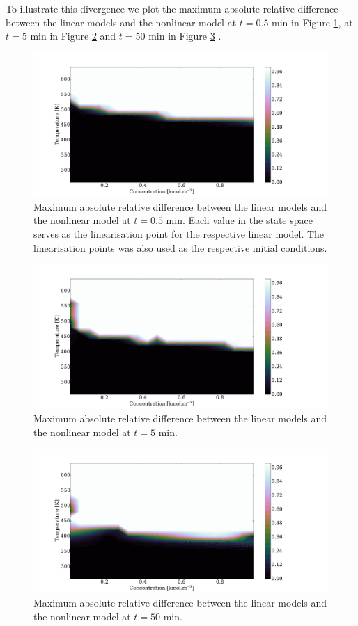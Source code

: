 \documentclass[../masters.tex]{subfiles}
\begin{document}
To illustrate this divergence we plot the maximum absolute relative difference between the linear models and the nonlinear model at $t = 0.5$ min in Figure \ref{fig_cstr_regions1}, at $t = 5$ min in Figure \ref{fig_cstr_regions2} and $t = 50$ min in Figure \ref{fig_cstr_regions3} . 
\begin{figure}[H] 
\centering
\includegraphics[scale=0.3]{cstr_regions1.pdf}
\caption{Maximum absolute relative difference between the linear models and the nonlinear model at $t=0.5$ min. Each value in the state space serves as the linearisation point for the respective linear model. The linearisation points was also used as the respective initial conditions.}
\label{fig_cstr_regions1}
\end{figure}
\begin{figure}[H] 
\centering
\includegraphics[scale=0.3]{cstr_regions3.pdf} %
\caption{Maximum absolute relative difference between the linear models and the nonlinear model at $t=5$ min.}
\label{fig_cstr_regions2}
\end{figure}
\begin{figure}[H] 
\centering
\includegraphics[scale=0.3]{cstr_regions2.pdf} %
\caption{Maximum absolute relative difference between the linear models and the nonlinear model at $t=50$ min.}
\label{fig_cstr_regions3}
\end{figure}
\end{document}
